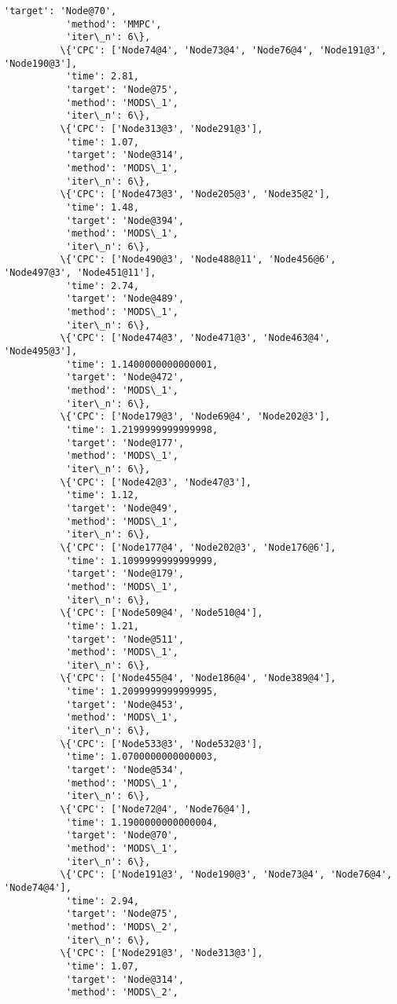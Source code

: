 \documentclass[11pt]{article}
\begin{document}
\begin{Verbatim}[commandchars=\\\{\}]
           'target': 'Node@70',
           'method': 'MMPC',
           'iter\_n': 6\},
          \{'CPC': ['Node74@4', 'Node73@4', 'Node76@4', 'Node191@3', 'Node190@3'],
           'time': 2.81,
           'target': 'Node@75',
           'method': 'MODS\_1',
           'iter\_n': 6\},
          \{'CPC': ['Node313@3', 'Node291@3'],
           'time': 1.07,
           'target': 'Node@314',
           'method': 'MODS\_1',
           'iter\_n': 6\},
          \{'CPC': ['Node473@3', 'Node205@3', 'Node35@2'],
           'time': 1.48,
           'target': 'Node@394',
           'method': 'MODS\_1',
           'iter\_n': 6\},
          \{'CPC': ['Node490@3', 'Node488@11', 'Node456@6', 'Node497@3', 'Node451@11'],
           'time': 2.74,
           'target': 'Node@489',
           'method': 'MODS\_1',
           'iter\_n': 6\},
          \{'CPC': ['Node474@3', 'Node471@3', 'Node463@4', 'Node495@3'],
           'time': 1.1400000000000001,
           'target': 'Node@472',
           'method': 'MODS\_1',
           'iter\_n': 6\},
          \{'CPC': ['Node179@3', 'Node69@4', 'Node202@3'],
           'time': 1.2199999999999998,
           'target': 'Node@177',
           'method': 'MODS\_1',
           'iter\_n': 6\},
          \{'CPC': ['Node42@3', 'Node47@3'],
           'time': 1.12,
           'target': 'Node@49',
           'method': 'MODS\_1',
           'iter\_n': 6\},
          \{'CPC': ['Node177@4', 'Node202@3', 'Node176@6'],
           'time': 1.1099999999999999,
           'target': 'Node@179',
           'method': 'MODS\_1',
           'iter\_n': 6\},
          \{'CPC': ['Node509@4', 'Node510@4'],
           'time': 1.21,
           'target': 'Node@511',
           'method': 'MODS\_1',
           'iter\_n': 6\},
          \{'CPC': ['Node455@4', 'Node186@4', 'Node389@4'],
           'time': 1.2099999999999995,
           'target': 'Node@453',
           'method': 'MODS\_1',
           'iter\_n': 6\},
          \{'CPC': ['Node533@3', 'Node532@3'],
           'time': 1.0700000000000003,
           'target': 'Node@534',
           'method': 'MODS\_1',
           'iter\_n': 6\},
          \{'CPC': ['Node72@4', 'Node76@4'],
           'time': 1.1900000000000004,
           'target': 'Node@70',
           'method': 'MODS\_1',
           'iter\_n': 6\},
          \{'CPC': ['Node191@3', 'Node190@3', 'Node73@4', 'Node76@4', 'Node74@4'],
           'time': 2.94,
           'target': 'Node@75',
           'method': 'MODS\_2',
           'iter\_n': 6\},
          \{'CPC': ['Node291@3', 'Node313@3'],
           'time': 1.07,
           'target': 'Node@314',
           'method': 'MODS\_2',

\end{Verbatim}
\end{document}
